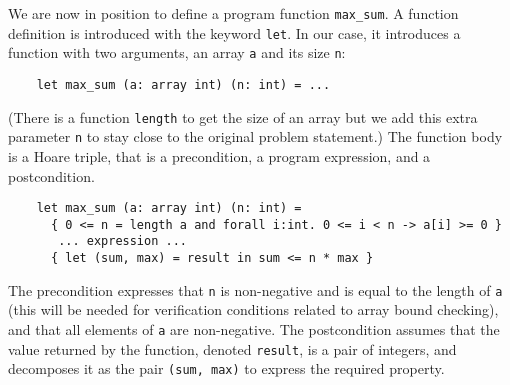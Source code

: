We are now in position to define a program function
\verb|max_sum|. A function definition is introduced with the keyword
\texttt{let}. In our case, it introduces a function with two arguments,
an array \texttt{a} and its size \texttt{n}:
\begin{verbatim}
    let max_sum (a: array int) (n: int) = ...
\end{verbatim}
(There is a function \texttt{length} to get the size of an array but
we add this extra parameter \texttt{n} to stay close to the original
problem statement.) The function body is a Hoare triple, that is a
precondition, a program expression, and a postcondition.
\begin{verbatim}
    let max_sum (a: array int) (n: int) =
      { 0 <= n = length a and forall i:int. 0 <= i < n -> a[i] >= 0 }
       ... expression ...
      { let (sum, max) = result in sum <= n * max }
\end{verbatim}
The precondition expresses that \texttt{n} is non-negative and is
equal to the length of \texttt{a} (this will be needed for
verification conditions related to array bound checking), and that all
elements of \texttt{a} are non-negative.
The postcondition assumes that the value returned by the function,
denoted \texttt{result}, is a pair of integers, and decomposes it as
the pair \texttt{(sum, max)} to express the required property.

